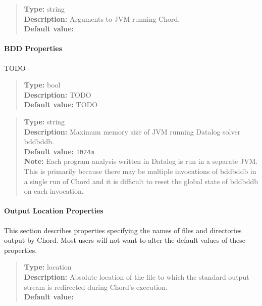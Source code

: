 \noindent {}
\begin{quote}
{\bf Type:} string \\
{\bf Description:} Arguments to JVM running Chord. \\
{\bf Default value:}    
\end{quote}

\paragraph{BDD Properties}

TODO

\noindent {}
\begin{quote}
{\bf Type:} bool \\
{\bf Description:} TODO \\
{\bf Default value:} TODO
\end{quote}

\noindent {}
\begin{quote}
{\bf Type:} string \\
{\bf Description:} Maximum memory size of JVM running Datalog solver bddbddb. \\
{\bf Default value:} {\tt 1024m} \\
{\bf Note:}  Each program analysis written in Datalog is run in a separate JVM.  This is primarily because there may be multiple invocations of bddbddb in a single run of Chord and it is difficult to reset the global state of bddbddb on each invocation. 
\end{quote}

\paragraph{Output Location Properties}

This section describes properties specifying the names of files and directories output by Chord.
Most users will not want to alter the default values of these properties.

\noindent {}
\begin{quote}
{\bf Type:} location \\
{\bf Description:} Absolute location of the file to which the standard output stream is redirected during Chord's execution. \\
{\bf Default value:} 
\end{quote}

